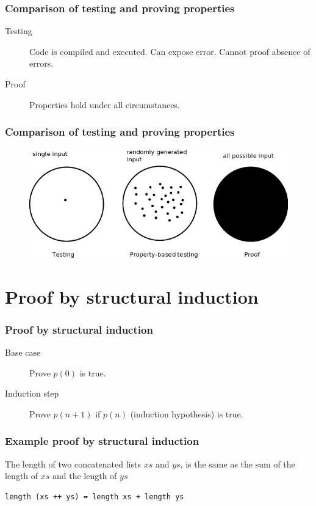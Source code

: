 \documentclass{beamer}
\begin{document}
\begin{frame}
  \frametitle{Comparison of testing and proving properties}
  \begin{description}
  \item[Testing] Code is compiled and executed. Can expose error. Cannot proof absence of errors. 
  \item[Proof] Properties hold under all circumstances.
\end{description}
\end{frame}

\begin{frame}
  \frametitle{Comparison of testing and proving properties}
\begin{figure}
  \centering
     \includegraphics[width=1\textwidth]{testing}
\end{figure}
\end{frame}

\section{Proof by structural induction}

\begin{frame}[fragile]
\frametitle{Proof by structural induction}
 \begin{description}
 \item[Base case] Prove $p(0)$ is true.
 \item[Induction step] Prove $p(n+1)$ if $p(n)$ (induction hypothesis) is true.
 \end{description}
\end{frame}

\begin{frame}[fragile]
\frametitle{Example proof by structural induction}
The length of two concatenated lists $xs$ and $ys$, is the same as the sum of the length of $xs$ and the length of $ys$
\begin{verbatim}
length (xs ++ ys) = length xs + length ys
\end{verbatim}

\end{frame}
\end{document}
